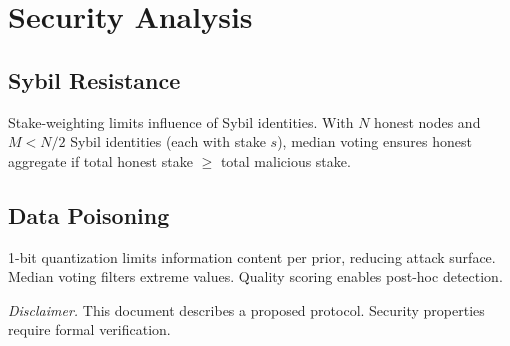 \documentclass[11pt]{article}
\begin{document}
\appendix
\section{Security Analysis}
\subsection{Sybil Resistance}
Stake-weighting limits influence of Sybil identities. With \(N\) honest nodes and \(M < N/2\) Sybil identities (each with stake \(s\)), median voting ensures honest aggregate if total honest stake \(\ge\) total malicious stake.

\subsection{Data Poisoning}
1-bit quantization limits information content per prior, reducing attack surface. Median voting filters extreme values. Quality scoring enables post-hoc detection.

\vspace{1em}
\noindent\textit{Disclaimer.} This document describes a proposed protocol. Security properties require formal verification.
\end{document}
